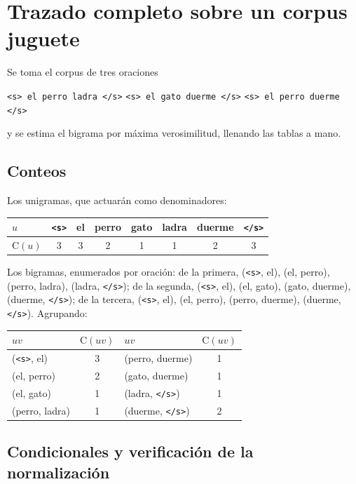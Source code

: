 \documentclass[11pt,letterpaper]{article}
\newcommand{\Count}{\mathrm{C}}
\newcommand{\bos}{\texttt{<s>}}
\newcommand{\eos}{\texttt{</s>}}
\begin{document}
\section{Trazado completo sobre un corpus juguete}

Se toma el corpus de tres oraciones
\begin{center}
\texttt{<s> el perro ladra </s>} \qquad
\texttt{<s> el gato duerme </s>} \qquad
\texttt{<s> el perro duerme </s>}
\end{center}
y se estima el bigrama por máxima verosimilitud, llenando las tablas a mano.

\subsection{Conteos}

Los unigramas, que actuarán como denominadores:

\begin{center}
\begin{tabular}{lccccccc}
\toprule
$u$ & \bos & el & perro & gato & ladra & duerme & \eos \\
\midrule
$\Count(u)$ & 3 & 3 & 2 & 1 & 1 & 2 & 3 \\
\bottomrule
\end{tabular}
\end{center}

Los bigramas, enumerados por oración: de la primera, (\bos, el), (el, perro),
(perro, ladra), (ladra, \eos); de la segunda, (\bos, el), (el, gato), (gato,
duerme), (duerme, \eos); de la tercera, (\bos, el), (el, perro), (perro,
duerme), (duerme, \eos). Agrupando:

\begin{center}
\begin{tabular}{lc@{\qquad}lc}
\toprule
$uv$ & $\Count(uv)$ & $uv$ & $\Count(uv)$\\
\midrule
(\bos, el)      & 3 & (perro, duerme) & 1\\
(el, perro)     & 2 & (gato, duerme)  & 1\\
(el, gato)      & 1 & (ladra, \eos)   & 1\\
(perro, ladra)  & 1 & (duerme, \eos)  & 2\\
\bottomrule
\end{tabular}
\end{center}

\subsection{Condicionales y verificación de la normalización}
\end{document}
